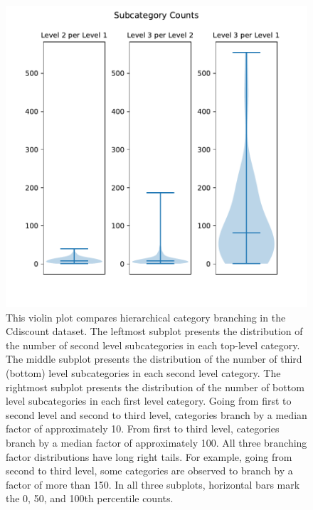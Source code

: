 \begin{figure}

\includegraphics[width=\columnwidth]{img/catcount}
\caption{
This violin plot compares hierarchical category branching in the Cdiscount dataset.
The leftmost subplot presents the distribution of the number of second level subcategories in each top-level category.
The middle subplot presents the distribution of the number of third (bottom) level subcategories in each second level category.
The rightmost subplot presents the distribution of the number of bottom level subcategories in each first level category.
Going from first to second level and second to third level, categories branch by a median factor of approximately 10. 
From first to third level, categories branch by a median factor of approximately 100.
All three branching factor distributions have long right tails.
For example, going from second to third level, some categories are observed to branch by a factor of more than 150.
In all three subplots, horizontal bars mark the 0, 50, and 100th percentile counts.
}
\label{fig:catcount}

\end{figure}
